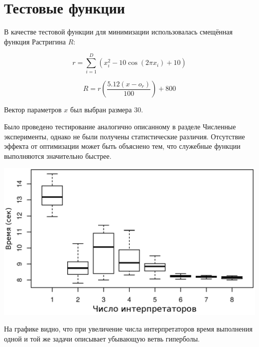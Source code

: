 \section*{Тестовые функции}

В качестве тестовой функции для минимизации
использовалась смещённая функция Растригина $R$:

\begin{equation*}
    r = \sum_{i = 1}^{D}(x_i^2 - 10\cos(2 \pi x_i) + 10)
\end{equation*}

\begin{equation*}
    R = r\left(\frac{5.12 (x - o_r)}{100}\right) + 800
\end{equation*}

Вектор параметров $x$ был выбран размера 30.

Было проведено тестирование
аналогично описанному в разделе
Численные эксперименты,
однако не были получены
статистические различия.
Отсутствие эффекта
от оптимизации может
быть объяснено тем,
что служебные функции
выполняются значительно быстрее.

\begin{center}
\includegraphics{rastrigin}
\end{center}

На графике видно,
что при увеличение числа интерпретаторов
время выполнения одной и той же задачи
описывает убывающую ветвь гиперболы.

